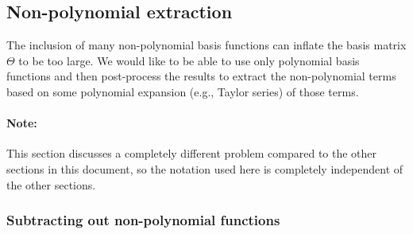 \documentclass{article}
\begin{document}
\subsection{Non-polynomial extraction}

The inclusion of many non-polynomial basis functions can inflate the basis
matrix $\Theta$ to be too large. We would like to be able to use only polynomial
basis functions and then post-process the results to extract the non-polynomial
terms based on some polynomial expansion (e.g., Taylor series) of those terms.

\paragraph{Note:} This section discusses a completely different problem compared to the other
sections in this document, so the notation used here is completely independent
of the other sections.

\subsubsection{Subtracting out non-polynomial functions}
\end{document}
